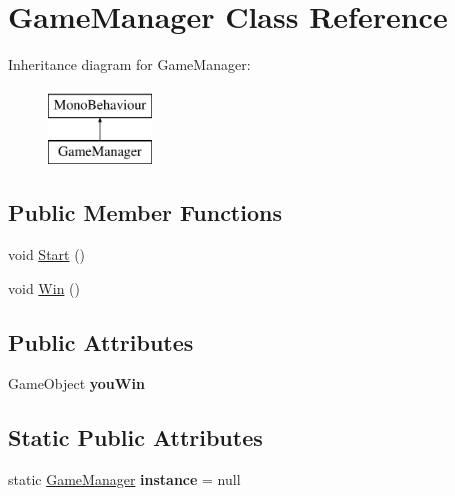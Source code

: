 \hypertarget{class_game_manager}{}\section{Game\+Manager Class Reference}
\label{class_game_manager}
Inheritance diagram for Game\+Manager\+:\begin{figure}[H]
\begin{center}
\leavevmode
\includegraphics[height=2.000000cm]{class_game_manager}
\end{center}
\end{figure}
\subsection*{Public Member Functions}
\begin{DoxyCompactItemize}
\item 
void \mbox{\hyperlink{class_game_manager_a5ccfacd027ad08eeb4ff1f25a7f59c98}{Start}} ()
\item 
void \mbox{\hyperlink{class_game_manager_a76a27f36d082e328bd1c7748d8832816}{Win}} ()
\end{DoxyCompactItemize}
\subsection*{Public Attributes}
\begin{DoxyCompactItemize}
\item 
\mbox{\label{class_game_manager_a9e2addf3b88748a4d46a5428e1e332f0}} 
Game\+Object {\bfseries you\+Win}
\end{DoxyCompactItemize}
\subsection*{Static Public Attributes}
\begin{DoxyCompactItemize}
\item 
\mbox{\label{class_game_manager_a7666e8468dac197b9eb32dd32128524f}} 
static \mbox{\hyperlink{class_game_manager}{Game\+Manager}} {\bfseries instance} = null
\end{DoxyCompactItemize}


